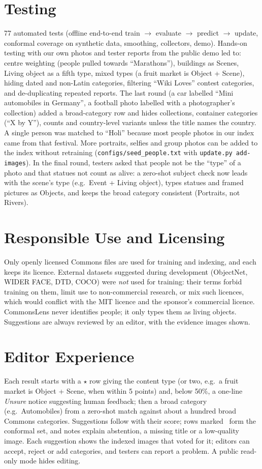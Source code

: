\documentclass[10pt,twocolumn]{article}
\begin{document}
\section{Testing}
77 automated tests (offline end-to-end train $\rightarrow$ evaluate $\rightarrow$ predict $\rightarrow$
update, conformal coverage on synthetic data, smoothing, collectors, demo). Hands-on testing with our own
photos and tester reports from the public demo led to: centre weighting (people pulled towards
``Marathons''), buildings as Scenes, Living object as a fifth type, mixed types (a fruit market is
Object + Scene), hiding dated and non-Latin categories, filtering ``Wiki Loves'' contest categories, and
de-duplicating repeated reports. The last round (a car labelled ``Mini automobiles in Germany'', a football
photo labelled with a photographer's collection) added a broad-category row and hides collections,
container categories (``X by Y''), counts and country-level variants unless the title names the country.
A single person was matched to ``Holi'' because most people photos in our index came from that festival.
More portraits, selfies and group photos can be added to the index without retraining
(\texttt{configs/seed\_people.txt} with \texttt{update.py add-images}). In the final round,
testers asked that people not be the ``type'' of a photo and that statues not count as alive: a zero-shot
subject check now leads with the scene's type (e.g.\ Event + Living object), types statues and framed
pictures as Objects, and keeps the broad category consistent (Portraits, not Rivers).

\section{Responsible Use and Licensing}
Only openly licensed Commons files are used for training and indexing, and each keeps its licence.
External datasets suggested during development (ObjectNet, WIDER FACE, DTD, COCO) were \emph{not} used
for training: their terms forbid training on them, limit use to non-commercial research, or mix such
licences, which would conflict with the MIT licence and the sponsor's commercial licence. CommonsLens never identifies people; it only types them as
living objects. Suggestions are always reviewed by an editor, with the evidence images shown.

\section{Editor Experience}
Each result starts with a {\color{accent}$\star$} row giving the content type (or two, e.g.\ a fruit
market is Object + Scene, when within 5 points) and, below 50\%, a one-line \emph{Unsure} notice suggesting human feedback; then a broad category
(e.g.\ Automobiles) from a zero-shot match against about a hundred broad Commons categories. Suggestions follow with
their score; rows marked \checkmark\ form the conformal set, and notes explain abstention, a missing title
or a low-quality image. Each suggestion shows the indexed images that voted for it; editors can accept,
reject or add categories, and testers can report a problem. A public read-only mode hides editing.
\end{document}
